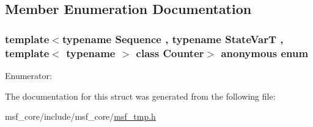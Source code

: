 \subsection{Member Enumeration Documentation}
\hypertarget{structmsf__tmp_1_1getStartIndex_ac40f372ad7bfcafacffb12b276ecc849}{\subsubsection[{anonymous enum}]{\setlength{\rightskip}{0pt plus 5cm}template$<$typename Sequence , typename State\-Var\-T , template$<$ typename $>$ class Counter$>$ anonymous enum}}\label{structmsf__tmp_1_1getStartIndex_ac40f372ad7bfcafacffb12b276ecc849}
\begin{Desc}
\item[Enumerator\-: ]\par
\begin{description}
\item[{\em 
\hypertarget{structmsf__tmp_1_1getStartIndex_ac40f372ad7bfcafacffb12b276ecc849a9b343ca7b3947537646aa5ebb03142b4}{value}\label{structmsf__tmp_1_1getStartIndex_ac40f372ad7bfcafacffb12b276ecc849a9b343ca7b3947537646aa5ebb03142b4}
}]\end{description}
\end{Desc}



The documentation for this struct was generated from the following file\-:\begin{DoxyCompactItemize}
\item 
msf\-\_\-core/include/msf\-\_\-core/\hyperlink{msf__tmp_8h}{msf\-\_\-tmp.\-h}\end{DoxyCompactItemize}
